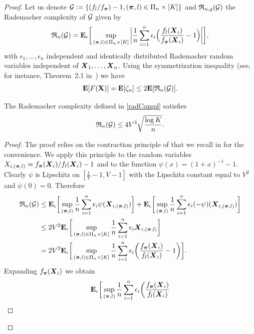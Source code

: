 \begin{proof}
	Let us denote $\mathcal G:=\{(f_l/f_{\boldsymbol \pi})-1, (\boldsymbol \pi,l)\in\Pi_n\times [K]\}$ and $\mathfrak{R}_{n,q}(\mathcal G)$ the Rademacher
	complexity of $\mathcal G$ given by
	\begin{equation}
	\label{radCompl}
	\mathfrak{R}_{n}(\mathcal G) = \mathbf E_{\epsilon}\bigg[ \sup_{(\boldsymbol \pi,l)\in\Pi_n\times[K]}\bigg| \frac{1}{n}\sum_{i=1}^n
	\epsilon_i\Big(\frac{f_l(\boldsymbol X_i)}{f_{\boldsymbol \pi}(\boldsymbol X_i)}-1\Big)\bigg| \bigg],
	\end{equation}
	with $\epsilon_1,\dots,\epsilon_n$ independent and identically distributed Rademacher random variables independent
	of $\boldsymbol X_1,\dots,\boldsymbol X_n$. Using the symmetrization inequality (see, for instance, Theorem~2.1 in~\cite{KoltBook2011})
	we have
	\begin{equation}
	\label{rademacher}
	\mathbf E[F(\mathbf X)] = \mathbf E[\zeta_n] \leq 2\mathbf E[\mathfrak{R}_{n}(\mathcal G)].
	\end{equation}
	\begin{lemma}
		\label{boundRademComplex}
		The Rademacher complexity defined in \eqref{radCompl} satisfies
		\begin{equation}
		\mathfrak{R}_n(\mathcal G) \leq  4V^3\sqrt{\frac{\log K}{n}}.
		\end{equation}
	\end{lemma}
	\begin{proof}
		The proof relies on the contraction principle of \cite{LedouxTal:91} that we recall in
		 for the convenience. We apply this principle to the random variables
		$X_{i,(\boldsymbol \pi,l)}=f_{\boldsymbol \pi}(\boldsymbol X_i)/f_l(\boldsymbol X_i)-1$ and to the function $\psi(x) = (1+x)^{-1}-1$.
		Clearly $\psi$ is Lipschitz on
		$[\frac{1}{V}-1,V-1]$ with the Lipschitz constant equal to $V^2$ and $\psi(0)=0$. Therefore
		\begin{align}
		\mathfrak{R}_{n}(\mathcal G)
		& \le  \mathbf E_{\epsilon}\bigg[ \sup_{(\boldsymbol \pi,l)} \frac{1}{n}\sum_{i=1}^n
		\epsilon_i\psi(\boldsymbol X_{i,(\boldsymbol \pi,l)})\bigg]
		+\mathbf E_{\epsilon}\bigg[ \sup_{(\boldsymbol \pi,l)}\frac{1}{n}\sum_{i=1}^n
		\epsilon_i(-\psi)(\boldsymbol X_{i,(\boldsymbol \pi,l)})\bigg]\\
		&\leq 2V^2\mathbf E_{\epsilon}\bigg[ \sup_{(\boldsymbol \pi,l)\in\Pi_n\times[K]}\frac{1}{n}
		\sum_{i=1}^n \epsilon_i \boldsymbol X_{i,(\boldsymbol \pi,l)} \bigg]\\
		&= 2V^2 \mathbf E_{\epsilon}\bigg[ \sup_{(\boldsymbol \pi,l)\in\Pi_n\times[K]}\frac{1}{n}\sum_{i=1}^n \epsilon_i
		\bigg(\frac{f_{\boldsymbol \pi}(\boldsymbol X_i)}{f_l(\boldsymbol X_i)} -1\bigg) \bigg].
		\end{align}
		Expanding $f_{\boldsymbol \pi}(\boldsymbol X_i)$ we obtain
		\begin{align}
		\Ex_{\epsilon}\bigg[ \sup_{(\bpi,l)}\frac{1}{n}\sum_{i=1}^n \epsilon_i \bigg(\frac{f_{\bpi}(\bX_i)}{f_l(\bX_i)}

\end{align}
\end{proof}
\end{proof}
